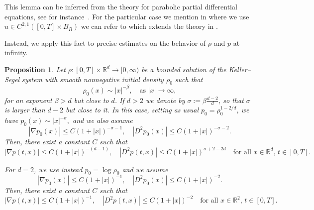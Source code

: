 \documentclass[11pt,a4paper]{article}
\numberwithin{equation}{section}
\theoremstyle{plain}
\newtheorem{proposition}[theorem]{Proposition}
\theoremstyle{remark}
\begin{document}
This lemma can be inferred from the theory for parabolic partial differential equations, see for instance~\cite{LSU68, Amann90, Lieberman96}. For the particular case we mention in  where we use $u \in C^{2,1} ([0,T] \times B_R)$ we can refer to \cite[Theorem 2.1]{Wen_Fan_Asiri_Alzahrani_El-Dessoky_Kuang17} which extends the theory in \cite{LSU68}. %

Instead, we apply this fact to precise estimates on the behavior of $\rho$ and $p$ at infinity. 

\begin{proposition}\label{prop:lipschitz-porous}
Let $\rho:[0,T]\times\mathbb R^{d}\to[0,\infty)$ be a bounded solution of the Keller--Segel system with smooth nonnegative initial density $\rho_0$ such that
\[
     \rho_0(x)
     \sim|x|^{-\beta},
     \quad\text{as }|x|\to\infty,
\]
for an exponent $\beta>d$ but close to $d$. If $d>2$ we denote by $\sigma:=\beta\frac{d-2}{d}$, so that $\sigma$ is larger than $d-2$ but close to it. In this case, setting as usual $p_0=\rho_0^{1-2/d}$, we have $p_0(x)\sim |x|^{-\sigma},$ and we also assume
$$|\nabla p_0(x)|\le C(1+|x|)^{-\sigma-1}, \quad |D^2p_0(x)|\leq C(1+ |x|)^{-\sigma-2}.$$
Then, there exist a constant $C$ such that
\begin{equation}\label{eq:MainGradDecay}
     |\nabla p(t,x)|
      \le 
     C(1+|x|)^{-(d-1)},\quad |D^2p(t,x)|\leq   C(1+|x|)^{\sigma+2-2d}
     \quad
     \mbox{for all }x\in\mathbb R^{d},\,t\in[0,T].
\end{equation}

For $d=2$, we use instead $p_0=\log\rho_0$ and we assume 
$$|\nabla p_0(x)|\le C(1+|x|)^{-1}, \quad |D^2p_0(x)|\leq C(1+ |x|)^{-2}.$$
Then, there exist a constant $C$ such that
\begin{equation}\label{eq:MainGradDecay2}
     |\nabla p(t,x)|
      \le 
     C(1+|x|)^{-1},\quad |D^2p(t,x)|\leq   C(1+|x|)^{-2}
     \quad
     \mbox{for all }x\in\mathbb R^{2},\,t\in[0,T].
\end{equation}
\end{proposition}
\end{document}
